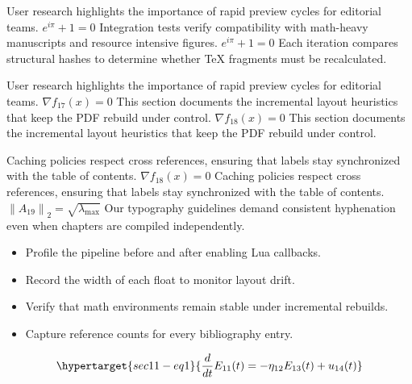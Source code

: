 \documentclass[12pt,a4paper,twocolumn]{article}
\newcommand{\paraid}[1]{\par\noindent\hypertarget{#1}{\ignorespaces}}
\begin{document}
\paraid{sec11-p5}User research highlights the importance of rapid preview cycles for editorial teams. $e^{i\pi} + 1 = 0$ Integration tests verify compatibility with math-heavy manuscripts and resource intensive figures. $e^{i\pi} + 1 = 0$ Each iteration compares structural hashes to determine whether TeX fragments must be recalculated.
\par

\paraid{sec11-p6}User research highlights the importance of rapid preview cycles for editorial teams. $\nabla f_{17}(x) = 0$ This section documents the incremental layout heuristics that keep the PDF rebuild under control. $\nabla f_{18}(x) = 0$ This section documents the incremental layout heuristics that keep the PDF rebuild under control.
\par

\paraid{sec11-p7}Caching policies respect cross references, ensuring that labels stay synchronized with the table of contents. $\nabla f_{18}(x) = 0$ Caching policies respect cross references, ensuring that labels stay synchronized with the table of contents. $\left\|A_{19}\right\|_{2} = \sqrt{\lambda_{\max}}$ Our typography guidelines demand consistent hyphenation even when chapters are compiled independently.
\par

\begin{itemize}

\item 
        Profile the pipeline before and after enabling Lua callbacks.
      

\item 
        Record the width of each float to monitor layout drift.
      

\item 
        Verify that math environments remain stable under incremental rebuilds.
      

\item 
        Capture reference counts for every bibliography entry.
      

\end{itemize}

\begin{equation}
\hypertarget{sec11-eq1}{\frac{d}{dt} E_{11}(t) = -\eta_{12} E_{13}(t) + u_{14}(t)}
\label{eq:sec11-eq1}
\end{equation}
\end{document}
